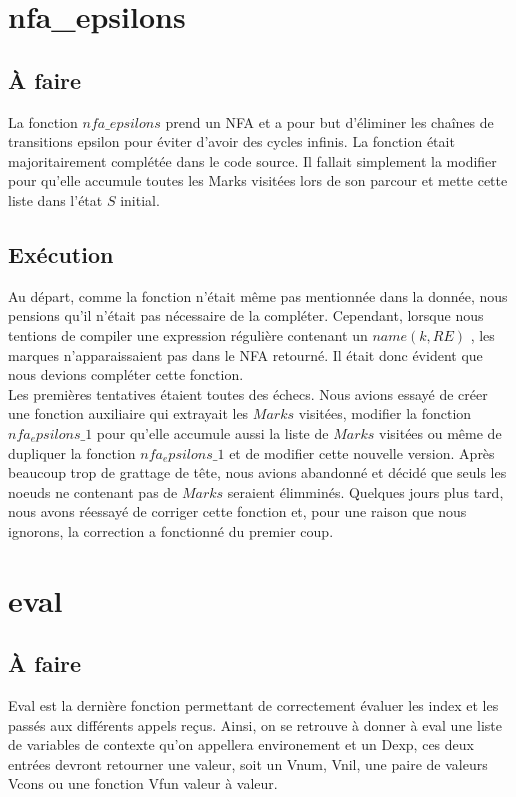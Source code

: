 \documentclass{article}
\begin{document}
 
\section{nfa\_epsilons}
\subsection{À faire}

    La fonction $nfa\_epsilons$ prend un NFA et a pour but d'éliminer les chaînes 
    de transitions epsilon pour éviter d'avoir des cycles infinis. La fonction 
    était majoritairement complétée dans le code source. 
    Il fallait simplement la modifier pour qu'elle accumule toutes les Marks 
    visitées lors de son parcour et mette cette liste dans l'état $S$ initial.

\subsection{Exécution}
    Au départ, comme la fonction n'était même pas mentionnée dans la donnée, 
    nous pensions qu'il n'était pas nécessaire de la compléter. Cependant, 
    lorsque nous tentions de compiler une expression régulière contenant un 
    $name(k, RE)$ , les marques n'apparaissaient pas dans le NFA retourné. 
    Il était donc évident que nous devions compléter cette fonction. \\
    Les premières tentatives étaient toutes des échecs. Nous avions essayé de 
    créer une fonction auxiliaire qui extrayait les $Marks$ visitées, modifier 
    la fonction $nfa_epsilons\_1$ pour qu'elle accumule aussi la liste de $Marks$ 
    visitées ou même de dupliquer la fonction $nfa_epsilons\_1$ et de modifier 
    cette nouvelle version. Après beaucoup trop de grattage de tête, nous 
    avions abandonné et décidé que seuls les noeuds ne contenant pas de 
    $Marks$ seraient élimminés. Quelques jours plus tard, nous avons réessayé 
    de corriger cette fonction et, pour une raison que nous ignorons, la 
    correction a fonctionné du premier coup. 
    
    
    
\section{eval}
\subsection{À faire}    
    Eval est la dernière fonction permettant de correctement évaluer les index et les passés aux différents appels reçus. Ainsi, on se retrouve à donner à eval une liste de variables de contexte qu'on appellera environement et un Dexp, ces deux entrées devront retourner une valeur, soit un Vnum, Vnil, une paire de valeurs Vcons ou une fonction Vfun valeur à valeur.
    
\end{document}
